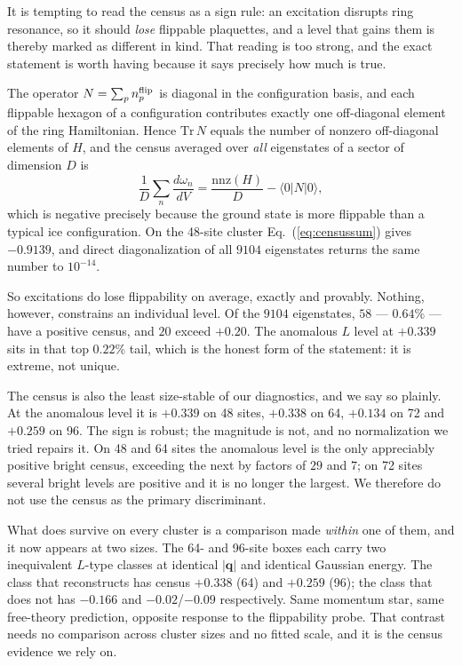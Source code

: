 \documentclass[aps,prl,twocolumn,amsmath,amssymb,superscriptaddress,
longbibliography,floatfix]{revtex4-2}
\newcommand{\bq}{\bm q}
\begin{document}
\label{sec:census-limits}

It is tempting to read the census as a sign rule: an excitation
disrupts ring resonance, so it should \emph{lose} flippable plaquettes,
and a level that gains them is thereby marked as different in kind.
That reading is too strong, and the exact statement is worth having
because it says precisely how much is true.

The operator $N=\sum_p n_p^{\rm flip}$ is diagonal in the
configuration basis, and each flippable hexagon of a configuration
contributes exactly one off-diagonal element of the ring Hamiltonian.
Hence $\mathrm{Tr}\,N$ equals the number of nonzero off-diagonal
elements of $H$, and the census averaged over \emph{all} eigenstates of
a sector of dimension $D$ is
\begin{equation}
 \frac{1}{D}\sum_{n}\frac{d\omega_n}{dV}
 =\frac{\mathrm{nnz}(H)}{D}-\langle 0|N|0\rangle ,
 \label{eq:censussum}
\end{equation}
which is negative precisely because the ground state is more flippable
than a typical ice configuration. On the 48-site cluster
Eq.~(\ref{eq:censussum}) gives $-0.9139$, and direct diagonalization of
all $9104$ eigenstates returns the same number to $10^{-14}$.

So excitations do lose flippability on average, exactly and provably.
Nothing, however, constrains an individual level. Of the $9104$
eigenstates, $58$ --- $0.64\%$ --- have a positive census, and $20$
exceed $+0.20$. The anomalous $L$ level at $+0.339$ sits in that top
$0.22\%$ tail, which is the honest form of the statement: it is
extreme, not unique.

The census is also the least size-stable of our diagnostics, and we say
so plainly. At the anomalous level it is $+0.339$ on 48 sites,
$+0.338$ on 64, $+0.134$ on 72 and $+0.259$ on 96. The sign is
robust; the magnitude is not, and no normalization we tried repairs
it. On 48 and 64 sites the anomalous level is the only appreciably
positive bright census, exceeding the next by factors of $29$ and $7$;
on 72 sites several bright levels are positive and it is no longer the
largest. We therefore do not use the census as the primary
discriminant.

What does survive on every cluster is a comparison made \emph{within}
one of them, and it now appears at two sizes. The 64- and 96-site
boxes each carry two inequivalent $L$-type classes
at identical $|\bq|$ and identical Gaussian energy. The class that
reconstructs has census $+0.338$ (64) and $+0.259$ (96); the class
that does not has
$-0.166$ and $-0.02$/$-0.09$ respectively. Same momentum star, same
free-theory prediction, opposite
response to the flippability probe. That contrast needs no comparison
across cluster sizes and no fitted scale, and it is the census evidence
we rely on.
\end{document}
